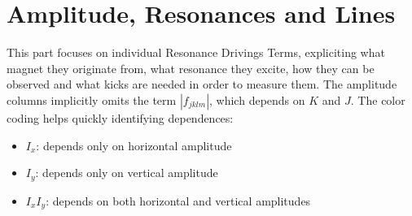 \section{Amplitude, Resonances and Lines}

This part focuses on individual Resonance Drivings Terms, expliciting what magnet they originate
from, what resonance they excite, how they can be observed and what kicks are needed in order to
measure them.  The amplitude columns implicitly omits the term $|f_{jklm}|$, which depends on $K$
and $J$. The color coding helps quickly identifying dependences:

\begin{itemize}
\tightlist
\item
  \colorbox{orange!20}{$I_x$}: depends only on horizontal amplitude
\item
  \colorbox{red!20}{$I_y$}: depends only on vertical amplitude
\item
  \colorbox{blue!20}{$I_x I_y$}: depends on both horizontal and vertical
  amplitudes
\end{itemize}


